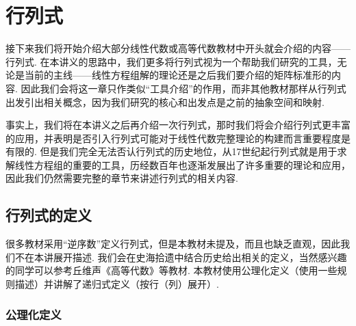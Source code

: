 \chapter{行列式}

接下来我们将开始介绍大部分线性代数或高等代数教材中开头就会介绍的内容——行列式. 在本讲义的思路中，我们更多将行列式视为一个帮助我们研究的工具，无论是当前的主线——线性方程组解的理论还是之后我们要介绍的矩阵标准形的内容. 因此我们会将这一章只作类似``工具介绍''的作用，而非其他教材那样从行列式出发引出相关概念，因为我们研究的核心和出发点是之前的抽象空间和映射.

事实上，我们将在本讲义之后再介绍一次行列式，那时我们将会介绍行列式更丰富的应用，并表明是否引入行列式可能对于线性代数完整理论的构建而言重要程度是有限的. 但是我们完全无法否认行列式的历史地位，从17世纪起行列式就是用于求解线性方程组的重要的工具，历经数百年也逐渐发展出了许多重要的理论和应用，因此我们仍然需要完整的章节来讲述行列式的相关内容.

\section{行列式的定义}

很多教材采用``逆序数''定义行列式，但是本教材未提及，而且也缺乏直观，因此我们不在本讲展开描述. 我们会在史海拾遗中结合历史给出相关的定义，当然感兴趣的同学可以参考丘维声《高等代数》等教材. 本教材使用公理化定义（使用一些规则描述）并讲解了递归式定义（按行（列）展开）.

\subsection{公理化定义}

